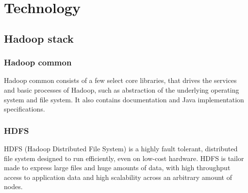 \documentclass[a4paper,english]{report}
\begin{document}
	\section{Technology}
	\label{technology}
		
		\subsection{Hadoop stack}
		
		\subsubsection{Hadoop common}
		Hadoop common consists of a few select core libraries, that drives the services and basic processes of Hadoop, such as abstraction of the underlying operating system and file system. It also contains documentation and Java implementation specifications. 
		
		\subsubsection{HDFS}
		HDFS (Hadoop Distributed File System) is a highly fault tolerant, distributed file system designed to run efficiently, even on low-cost hardware. HDFS is tailor made to express large files and huge amounts of data, with high throughput access to application data and high scalability across an arbitrary amount of nodes.
		
\end{document}
